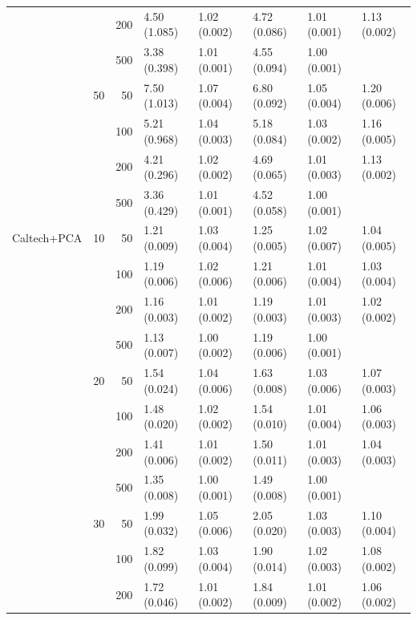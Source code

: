\begin{longtable}{p{}lrlllll}
      &     & 200 &   4.50 (1.085) &   1.02 (0.002) &   4.72 (0.086) &         1.01 (0.001) &  1.13 (0.002) \\
      &     & 500 &   3.38 (0.398) &   1.01 (0.001) &   4.55 (0.094) &         1.00 (0.001) &            \\
      & 50  & 50  &   7.50 (1.013) &   1.07 (0.004) &   6.80 (0.092) &         1.05 (0.004) &  1.20 (0.006) \\
      &     & 100 &   5.21 (0.968) &   1.04 (0.003) &   5.18 (0.084) &         1.03 (0.002) &  1.16 (0.005) \\
      &     & 200 &   4.21 (0.296) &   1.02 (0.002) &   4.69 (0.065) &         1.01 (0.003) &  1.13 (0.002) \\
      &     & 500 &   3.36 (0.429) &   1.01 (0.001) &   4.52 (0.058) &         1.00 (0.001) &            \\
\midrule
Caltech+PCA & 10  & 50  &   1.21 (0.009) &   1.03 (0.004) &   1.25 (0.005) &         1.02 (0.007) &  1.04 (0.005) \\
      &     & 100 &   1.19 (0.006) &   1.02 (0.006) &   1.21 (0.006) &         1.01 (0.004) &  1.03 (0.004) \\
      &     & 200 &   1.16 (0.003) &   1.01 (0.002) &   1.19 (0.003) &         1.01 (0.003) &  1.02 (0.002) \\
      &     & 500 &   1.13 (0.007) &   1.00 (0.002) &   1.19 (0.006) &         1.00 (0.001) &            \\
      & 20  & 50  &   1.54 (0.024) &   1.04 (0.006) &   1.63 (0.008) &         1.03 (0.006) &  1.07 (0.003) \\
      &     & 100 &   1.48 (0.020) &   1.02 (0.002) &   1.54 (0.010) &         1.01 (0.004) &  1.06 (0.003) \\
      &     & 200 &   1.41 (0.006) &   1.01 (0.002) &   1.50 (0.011) &         1.01 (0.003) &  1.04 (0.003) \\
      &     & 500 &   1.35 (0.008) &   1.00 (0.001) &   1.49 (0.008) &         1.00 (0.001) &            \\
      & 30  & 50  &   1.99 (0.032) &   1.05 (0.006) &   2.05 (0.020) &         1.03 (0.003) &  1.10 (0.004) \\
      &     & 100 &   1.82 (0.099) &   1.03 (0.004) &   1.90 (0.014) &         1.02 (0.003) &  1.08 (0.002) \\
      &     & 200 &   1.72 (0.046) &   1.01 (0.002) &   1.84 (0.009) &         1.01 (0.002) &  1.06 (0.002) \\

\end{longtable}
